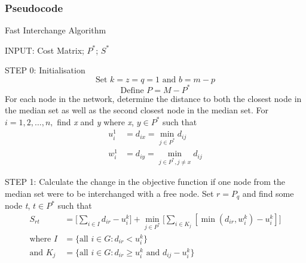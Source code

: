 \documentclass[11pt]{article}
\begin{document}
	\subsubsection{Pseudocode}
	\begin{algorithm}
		\caption{Fast Interchange Algorithm}
		\begin{algorithmic}[0]
			\Statex 
			\Statex INPUT: Cost Matrix; $P^*$; $S^*$
			
			\Statex 
			\Statex STEP 0: Initialisation
			\begin{equation*}
			\text{Set } k = z = q = 1 \text{ and } b=m-p
			\end{equation*}
			\begin{equation*}
			\text{Define } P=M-P^*
			\end{equation*}
			\Statex For each node in the network, determine the distance to both the closest node in the median set as well as the second closest node in the median set.
			\Statex For $i=1,2,\dots,n ,$ find \emph{x} and \emph{y} where \emph{x}, $y \in P^*$ such that
			\begin{align*}
			u_i^1 & = d_{ix} = \min_{j\in P^*}d_{ij}\\
			w_i^1 & = d_{iy} = \min_{j\in P^*, j\neq x}d_{ij}
			\end{align*}

			
			\Statex
			\Statex STEP 1: Calculate the change in the objective function if one node from the median set were to be interchanged with a free node.
			\Statex Set $r=P_q$ and find some node \emph{t}, $t \in P^*$ such that
			\begin{align*}
			S_{rt} &= \bigg[\sum_{i \in I}d_{ir}-u_i^k\bigg] + \min_{j\in P^*}\bigg[\sum_{i \in K_j}[\min(d_{ir}, w_i^k)-u_i^k]\bigg]\\
			\text{where } I &= \{\text{all } i \in G: d_{ir}<u_i^k\}\\
			\text{and } K_j &= \{\text{all } i \in G: d_{ir}\geq u_i^k\text{ and } d_{ij} - u_i^k\}
			\end{align*}

\Statex	
{}
\end{algorithmic}
\end{algorithm}
\end{document}
